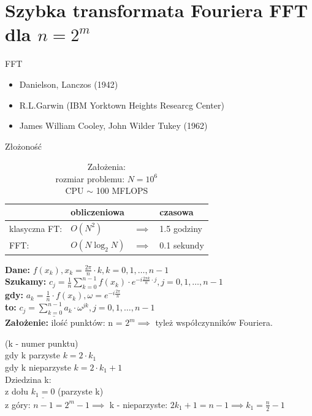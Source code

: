 \section{Szybka transformata Fouriera FFT dla $n=2^m$}
\begin{frame}[allowframebreaks]{FFT}
	\begin{itemize}
		\item Danielson, Lanczos (1942)
		\item R.L.Garwin (IBM Yorktown Heights Researcg Center)
		\item James William Cooley, John Wilder Tukey (1962)
	\end{itemize}
	\begin{table}
		\centering
		\caption{Złożoność}
		\begin{tabular}{l|lll}
			& obliczeniowa && czasowa \\
			\hline
			klasyczna FT: & $O(N^2)$ & $\implies$ & 1.5 godziny \\
			FFT: & $O(N\log_2N)$ & $\implies$ & 0.1 sekundy 
		\end{tabular}
		\caption*{Założenia: \\
			rozmiar problemu: $N = 10^6$ \\
			CPU $\sim$ 100 MFLOPS}
	\end{table}
	\textbf{Dane:} $f(x_k), x_k = \frac{2\pi}{n} \cdot k, k = 0, 1, \dots, n-1$ \\
	\textbf{Szukamy:} $c_j = \frac{1}{n} \sum\limits_{k = 0}^{n-1} f(x_k) \cdot e^{-i\frac{2\pi k}{n} \cdot j}, j = 0, 1, \dots, n-1$ \\
	\textbf{gdy:} $a_k = \frac{1}{n} \cdot f(x_k), \omega = e^{-i\frac{2\pi}{n}}$ \\
	\textbf{to:} $\underline{c_j = \sum\limits_{k = 0}^{n-1} a_k \cdot \omega^{jk}}, j = 0, 1, \dots, n-1$ \\
	\textbf{Założenie:} ilość punktów: n = $2^m \implies$ tyleż współczynników Fouriera. \\
	\begin{block}{}
	(k - numer punktu) \\
	gdy k parzyste $k = 2 \cdot k_1$ \\
	gdy k nieparzyste $k = 2 \cdot k_1 + 1$ \\
	Dziedzina k: \\
	z dołu $\underline{k_1 = 0}$ (parzyste k)  \\
	z góry: $n-1 = 2^m - 1 \implies$ k - nieparzyste: $2k_1 + 1 = n-1 \implies k_1 = \frac{n}{2} - 1$ \\

\end{block}
\end{frame}
